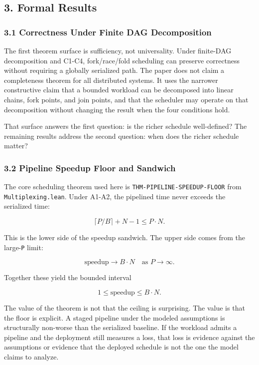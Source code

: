 \documentclass[
  11pt,
]{article}
\begin{document}
\subsection{3. Formal Results}\label{formal-results}

\subsubsection{3.1 Correctness Under Finite DAG
Decomposition}\label{correctness-under-finite-dag-decomposition}

The first theorem surface is sufficiency, not universality. Under
finite-DAG decomposition and C1-C4, fork/race/fold scheduling can
preserve correctness without requiring a globally serialized path. The
paper does not claim a completeness theorem for all distributed systems.
It uses the narrower constructive claim that a bounded workload can be
decomposed into linear chains, fork points, and join points, and that
the scheduler may operate on that decomposition without changing the
result when the four conditions hold.

That surface answers the first question: is the richer schedule
well-defined? The remaining results address the second question: when
does the richer schedule matter?

\subsubsection{3.2 Pipeline Speedup Floor and
Sandwich}\label{pipeline-speedup-floor-and-sandwich}

The core scheduling theorem used here is
\texttt{THM-PIPELINE-SPEEDUP-FLOOR} from \texttt{Multiplexing.lean}.
Under A1-A2, the pipelined time never exceeds the serialized time:

\[
\lceil P/B \rceil + N - 1 \le P \cdot N.
\]

This is the lower side of the speedup sandwich. The upper side comes
from the large-\texttt{P} limit:

\[
\mathrm{speedup} \to B \cdot N \quad \text{as } P \to \infty.
\]

Together these yield the bounded interval

\[
1 \le \mathrm{speedup} \le B \cdot N.
\]

The value of the theorem is not that the ceiling is surprising. The
value is that the floor is explicit. A staged pipeline under the modeled
assumptions is structurally non-worse than the serialized baseline. If
the workload admits a pipeline and the deployment still measures a loss,
that loss is evidence against the assumptions or evidence that the
deployed schedule is not the one the model claims to analyze.
\end{document}
